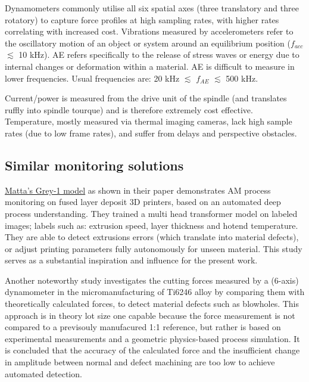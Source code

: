 \documentclass[5p,times,procedia]{elsarticle}
\begin{document}
\vspace*{-.5\baselineskip}
Dynamometers commonly utilise all six spatial axes (three translatory and three rotatory) to capture force profiles at high sampling rates, with higher rates correlating with increased cost.
Vibrations measured by accelerometers refer to the oscillatory motion of an object or system around an equilibrium position ($f_{acc}$ $\lesssim$ 10 kHz).
AE refers specifically to the release of stress waves or energy due to internal changes or deformation within a material. AE is difficult to measure in lower frequencies. Usual frequencies are: 20 kHz $\lesssim$ $f_{AE}$ $\lesssim$ 500 kHz. \cite{Jozwik.Mika2015, Sun.Hu.ea2020}

Current/power is measured from the drive unit of the spindle (and translates ruffly into spindle tourque) and is therefore extremely cost effective.
Temperature, mostly measured via thermal imaging cameras, lack high sample rates (due to low frame rates), and suffer from delays and perspective obstacles. 



\subsection{Similar monitoring solutions}
\vspace*{-\baselineskip}


\href{https://www.matta.ai/greymatta}{Matta's Grey-1 model} as shown in their paper \cite{Brion.Pattinson2022} demonstrates AM process monitoring on fused layer deposit 3D printers, based on an automated deep process understanding. 
They trained a multi head transformer model on labeled images; labels such as: extrusion speed, layer thickness and hotend temperature. They are able to detect extrusions errors (which translate into material defects), or adjust printing parameters fully autonomously for unseen material. \cite{Brion.Pattinson2022}
This study serves as a substantial inspiration and influence for the present work.


Another noteworthy study \cite{Pfirrmann.Baumann.ea2021} investigates the cutting forces measured by a (6-axis) dynamometer in the micromanufacturing of Ti6246 alloy by comparing them with theoretically calculated forces, to detect material defects such as blowholes.
This approach is in theory lot size one capable because the force measurement is not compared to a previsouly manufacured 1:1 reference, but rather is based on experimental measurements and a geometric physics-based process simulation. 
It is concluded that the accuracy of the calculated force and the insufficient change in amplitude between normal and defect machining are too low to achieve automated detection. \cite[p.169]{Pfirrmann.Baumann.ea2021} 
\end{document}
